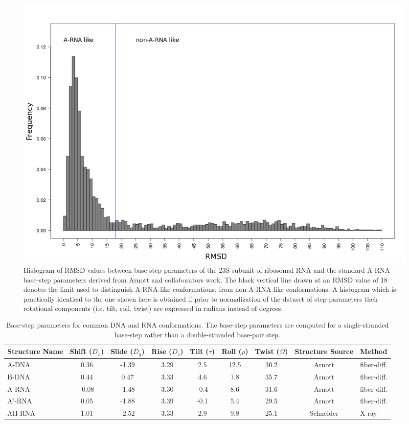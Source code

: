 \begin{figure}[ht]
 \centering
\includegraphics[angle=0, scale=0.38]{Chapter2/dormsd.png}
\caption{Histogram of RMSD values  between base-step parameters of the
23S  subunit  of  ribosomal  RNA  and  the  standard  A-RNA  base-step
parameters  derived from  Arnott  and collaborators  \cite{arnott1973}
work. The black vertical line drawn at an RMSD value of 18 denotes the
limit   used    to   distinguish   A-RNA-like    conformations,   from
non-A-RNA-like  conformations.   A   histogram  which  is  practically
identical to the one shown  here is obtained if prior to normalization
of  the   dataset  of  step-parameters   their  rotational  components
(i.e. tilt, roll, twist) are expressed in radians instead of degrees.}
\label{fig:dormsd}
\end{figure}

\begin{table}[ht]
\centering
\small\addtolength{\tabcolsep}{-2pt}
\begin{tabular}{p{1.4cm}|c|c|c|c|c|c|c|p{1.4cm}}
\hline
\textbf{Structure Name} & Shift ($D_x$) & Slide ($D_y$) & Rise ($D_z$) & Tilt
($\tau$) & Roll ($\rho$) & Twist ($\Omega$) & \textbf{Structure Source} &
\textbf{Method} \\ \hline
A-DNA & 0.36 & -1.39 & 3.29 & 2.5 & 12.5 & 30.2 & Arnott
\cite{arnott1999} & fiber-diff. \\ \hline
B-DNA & 0.44 & 0.47 & 3.33 & 4.6 & 1.8 & 35.7   & Arnott
\cite{arnott1999} & fiber-diff. \\ \hline
A-RNA & -0.08 & -1.48 & 3.30 & -0.4 & 8.6 & 31.6 & Arnott
\cite{arnott1999} & fiber-diff. \\ \hline
A'-RNA & 0.05 & -1.88 & 3.39 & -0.1 & 5.4 & 29.5 & Arnott
\cite{arnott1999} & fiber-diff. \\ \hline
AII-RNA & 1.01 & -2.52 & 3.33 & 2.9 & 9.8 & 25.1 & Schneider
\cite{schneider2004} & X-ray \\ \hline
\end{tabular}
\caption{Base-step   parameters    for   common    DNA    and   RNA
  conformations.   The  base-step  parameters   are  computed   for  a
  single-stranded  base-step rather  than a  double-stranded base-pair
  step.}
\label{tab:conf}
\end{table}

